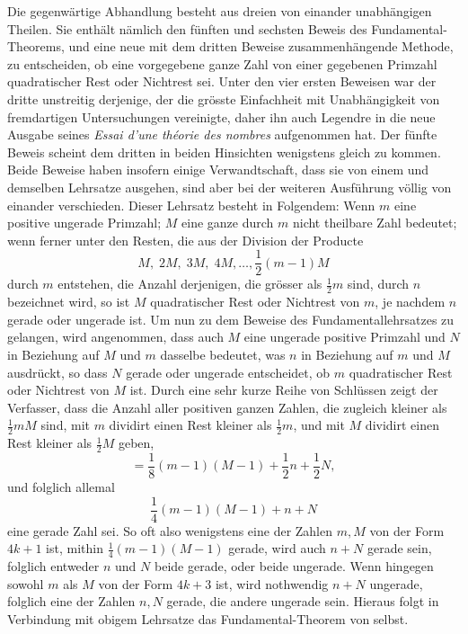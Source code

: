 \documentclass[12pt]{article}
\begin{document}
Die gegenwärtige Abhandlung besteht aus dreien von einander unabhängigen Theilen. Sie enthält nämlich den fünften und sechsten Beweis des Fundamental-Theorems, und eine neue mit dem dritten Beweise zusammenhängende Methode, zu entscheiden, ob eine vorgegebene ganze Zahl von einer gegebenen Primzahl quadratischer Rest oder Nichtrest sei. Unter den vier ersten Beweisen war der dritte unstreitig derjenige, der die grösste Einfachheit mit Unabhängigkeit von fremdartigen Untersuchungen vereinigte, daher ihn auch Legendre in die neue Ausgabe seines \textit{Essai d'une théorie des nombres} aufgenommen hat. Der fünfte Beweis scheint dem dritten in beiden Hinsichten wenigstens gleich zu kommen. Beide Beweise haben insofern einige Verwandtschaft, dass sie von einem und demselben Lehrsatze ausgehen, sind aber bei der weiteren Ausführung völlig von einander verschieden. Dieser Lehrsatz besteht in Folgendem: Wenn $m$ eine positive ungerade Primzahl; $M$ eine ganze durch $m$ nicht theilbare Zahl bedeutet; wenn ferner unter den Resten, die aus der Division der Producte
\[
M,\;2M,\;3M,\;4M,\ldots,\frac12(m-1)M
\]
durch $m$ entstehen, die Anzahl derjenigen, die grösser als $\frac12 m$ sind, durch $n$ bezeichnet wird, so ist $M$ quadratischer Rest oder Nichtrest von $m$, je nachdem $n$ gerade oder ungerade ist. Um nun zu dem Beweise des Fundamentallehrsatzes zu gelangen, wird angenommen, dass auch $M$ eine ungerade positive Primzahl und $N$ in Beziehung auf $M$ und $m$ dasselbe bedeutet, was $n$ in Beziehung auf $m$ und $M$ ausdrückt, so dass $N$ gerade oder ungerade entscheidet, ob $m$ quadratischer Rest oder Nichtrest von $M$ ist. Durch eine sehr kurze Reihe von Schlüssen zeigt der Verfasser, dass die Anzahl aller positiven ganzen Zahlen, die zugleich kleiner als $\frac12mM$ sind, mit $m$ dividirt einen Rest kleiner als $\frac12m$, und mit $M$ dividirt einen Rest kleiner als $\frac12M$ geben,
\[
=\frac18(m-1)(M-1)+\frac12 n+\frac12N,
\]
und folglich allemal
\[
\frac14(m-1)(M-1)+n+N
\]
eine gerade Zahl sei. So oft also wenigstens eine der Zahlen $m,M$ von der Form $4k+1$ ist, mithin $\frac14(m-1)(M-1)$ gerade, wird auch $n+N$ gerade sein, folglich entweder $n$ und $N$ beide gerade, oder beide ungerade. Wenn hingegen sowohl $m$ als $M$ von der Form $4k+3$ ist, wird nothwendig $n+N$ ungerade, folglich eine der Zahlen $n,N$ gerade, die andere ungerade sein. Hieraus folgt in Verbindung mit obigem Lehrsatze das Fundamental-Theorem von selbst.
\end{document}
